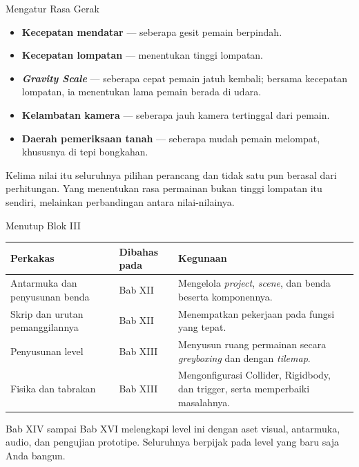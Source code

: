 \documentclass[aspectratio=169,10pt]{beamer}
\begin{document}
\begin{frame}{Mengatur Rasa Gerak}
\begin{itemize}
  \item \textbf{Kecepatan mendatar} --- seberapa gesit pemain berpindah.
  \item \textbf{Kecepatan lompatan} --- menentukan tinggi lompatan.
  \item \textbf{\emph{Gravity Scale}} --- seberapa cepat pemain jatuh kembali;
        bersama kecepatan lompatan, ia menentukan lama pemain berada di udara.
  \item \textbf{Kelambatan kamera} --- seberapa jauh kamera tertinggal dari
        pemain.
  \item \textbf{Daerah pemeriksaan tanah} --- seberapa mudah pemain melompat,
        khususnya di tepi bongkahan.
\end{itemize}
\begin{kotak}
Kelima nilai itu seluruhnya pilihan perancang dan tidak satu pun berasal dari
perhitungan. Yang menentukan rasa permainan bukan tinggi lompatan itu sendiri,
melainkan perbandingan antara nilai-nilainya.
\end{kotak}
\end{frame}

\begin{frame}{Menutup Blok III}
{\scriptsize
\renewcommand{\arraystretch}{1.12}
\begin{tabularx}{\textwidth}{@{}>{\raggedright\arraybackslash}p{3.6cm}
    >{\raggedright\arraybackslash}p{1.8cm}
    >{\raggedright\arraybackslash}X@{}}
\toprule
\textbf{Perkakas} & \textbf{Dibahas pada} & \textbf{Kegunaan} \\
\midrule
Antarmuka dan penyusunan benda & Bab XII &
  Mengelola \emph{project}, \emph{scene}, dan benda beserta komponennya. \\
\addlinespace
Skrip dan urutan pemanggilannya & Bab XII &
  Menempatkan pekerjaan pada fungsi yang tepat. \\
\addlinespace
Penyusunan level & Bab XIII &
  Menyusun ruang permainan secara \emph{greyboxing} dan dengan \emph{tilemap}. \\
\addlinespace
Fisika dan tabrakan & Bab XIII &
  Mengonfigurasi Collider, Rigidbody, dan trigger, serta memperbaiki
  masalahnya. \\
\bottomrule
\end{tabularx}}
\vspace{0.14cm}
\begin{kotak}
Bab XIV sampai Bab XVI melengkapi level ini dengan aset visual, antarmuka,
audio, dan pengujian prototipe. Seluruhnya berpijak pada level yang baru saja
Anda bangun.
\end{kotak}
\end{frame}
\end{document}
